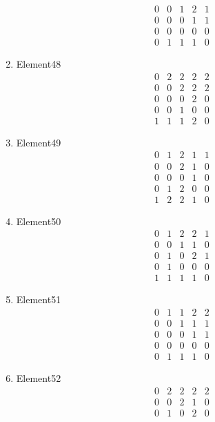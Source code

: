\documentclass[12pt]{article}
\begin{document}
\begin{multicols}{3}
\begin{enumerate}
\begin{equation*}
\begin{array}{ccccc}
0&0&1&2&1\\
0&0&0&1&1\\
0&0&0&0&0\\
0&1&1&1&0
\end{array}
\end{equation*}
\item Element48
\begin{equation*}
\begin{array}{ccccc}
0&2&2&2&2\\
0&0&2&2&2\\
0&0&0&2&0\\
0&0&1&0&0\\
1&1&1&2&0
\end{array}
\end{equation*}
\item Element49
\begin{equation*}
\begin{array}{ccccc}
0&1&2&1&1\\
0&0&2&1&0\\
0&0&0&1&0\\
0&1&2&0&0\\
1&2&2&1&0
\end{array}
\end{equation*}
\item Element50
\begin{equation*}
\begin{array}{ccccc}
0&1&2&2&1\\
0&0&1&1&0\\
0&1&0&2&1\\
0&1&0&0&0\\
1&1&1&1&0
\end{array}
\end{equation*}
\item Element51
\begin{equation*}
\begin{array}{ccccc}
0&1&1&2&2\\
0&0&1&1&1\\
0&0&0&1&1\\
0&0&0&0&0\\
0&1&1&1&0
\end{array}
\end{equation*}
\item Element52
\begin{equation*}
\begin{array}{ccccc}
0&2&2&2&2\\
0&0&2&1&0\\
0&1&0&2&0\\

\end{array}
\end{equation*}
\end{enumerate}
\end{multicols}
\end{document}
